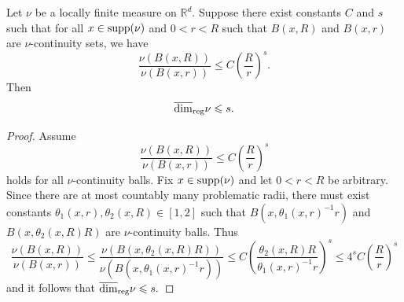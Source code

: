 \newpage
\begin{lemma}\label{ch-upper-reg:nu-cont-upper-dim}
	Let $\nu$ be a locally finite measure  on $ \mathbb{R}^d$. Suppose there exist constants $C$ and $s$ such that for all $x\in \textup{supp}(\nu)$ and $0<r<R$ such that $B(x,R)$ and $B(x,r)$ are $\nu$-continuity sets, we have
	\[
	\frac{\nu(B(x,R))}{\nu(B(x,r))} \leq C\left(\frac{R}{r}\right)^{s}.
	\]
	Then $$\overline{\dim}_{\textup{reg}}  \nu \le s.$$
\end{lemma}

\begin{proof}
	Assume 
	\[
	\frac{\nu(B(x,R))}{\nu(B(x,r))} \leq C\left(\frac{R}{r}\right)^{s}
	\]
	holds for all $\nu$-continuity balls. Fix $x  \in \textup{supp}(\nu)$ and let $0<r<R$ be arbitrary. Since there are at most countably many problematic radii, there must exist constants $\theta_1(x,r),\theta_2(x,R)\in[1,2]$ such that $B(x,\theta_1(x,r)^{-1}r)$ and $B(x,\theta_2(x,R) R)$ are $\nu$-continuity balls. Thus
	\[
	\frac{\nu(B(x,R))}{\nu(B(x,r))} \leq \frac{\nu(B(x,\theta_2(x,R)R))}{\nu(B(x,\theta_1(x,r)^{-1}r))} \le   C\left(\frac{\theta_2(x,R)R}{\theta_1(x,r)^{-1}r}\right)^{s} \le 4^s C \left(\frac{R}{r}\right)^{s}
	\]
	and it follows that $\overline{\dim}_{\textup{reg}}  \nu \le s.$
\end{proof}

